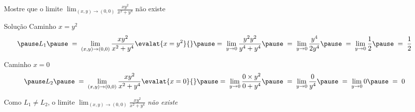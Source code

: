 \begin{question}
  Mostre que o limite
  \(
    \lim_{(x,y) \to (0,0)} \frac{xy^2}{x^2 + y^4}
  \)
  não existe
\end{question}

\begin{resolution}{Solução}
  Caminho \(x = y^2\)
  \[
    \pause
    L_1
    \pause
    \;=\; \lim_{(x,y) \to (0,0)} \frac{xy^2}{x^2 + y^4} \evalat{x = y^2}{}
    \pause
    =\; \lim_{y \to 0} \frac{y^2 y^2}{y^4 + y^4}
    \pause
    \;=\; \lim_{y \to 0} \frac{y^4}{2y^4}
    \pause
    \;=\; \lim_{y \to 0} \frac{1}{2}
    \pause
    \;=\; \frac{1}{2}
  \]

  \pause
  Caminho \(x = 0\)
  \[
    \pause
    L_2
    \pause
    \;=\; \lim_{(x,y) \to (0,0)} \frac{xy^2}{x^2 + y^4} \evalat{x = 0}{}
    \pause
    =\; \lim_{y \to 0} \frac{0 \times y^2}{0 + y^4}
    \pause
    \;=\; \lim_{y \to 0} \frac{0}{y^4}
    \pause
    \;=\; \lim_{y \to 0} 0
    \pause
    \;=\; 0
  \]

  \pause
  Como \(L_1\neq L_2\),
  \pause
  o limite
  \(
    \lim_{(x,y) \to (0,0)} \frac{xy^2}{x^2 + y^4}
  \)
  \emph{não existe}
\end{resolution}

